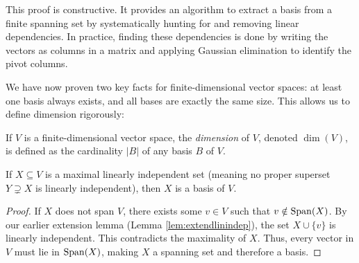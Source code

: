\documentclass[../linear_algebra_and_groups.tex]{subfiles}
\begin{document}
\begin{remark}
    This proof is constructive. It provides an algorithm to extract a basis from a finite spanning set by systematically hunting for and removing linear dependencies. In practice, finding these dependencies is done by writing the vectors as columns in a matrix and applying Gaussian elimination to identify the pivot columns.
\end{remark}

We have now proven two key facts for finite-dimensional vector spaces: at least one basis always exists, and all bases are exactly the same size. This allows us to define dimension rigorously:

\begin{definition}[Dimension]
    \begin{shaded*}
        If $V$ is a finite-dimensional vector space, the \textit{dimension} of $V$, denoted $\dim(V)$, is defined as the cardinality $|B|$ of any basis $B$ of $V$.
    \end{shaded*}
\end{definition}

\begin{proposition}
    \begin{shaded*}
        If $X \subseteq V$ is a maximal linearly independent set (meaning no proper superset $Y \supsetneq X$ is linearly independent), then $X$ is a basis of $V$.
    \end{shaded*}
\end{proposition}
\begin{proof}
    If $X$ does not span $V$, there exists some $v \in V$ such that $v \notin \operatorname{Span}(X)$. By our earlier extension lemma (Lemma \ref{lem:extendlinindep}), the set $X \cup \{v\}$ is linearly independent. This contradicts the maximality of $X$. Thus, every vector in $V$ must lie in $\operatorname{Span}(X)$, making $X$ a spanning set and therefore a basis.
    \qedhere
\end{proof}
\end{document}
